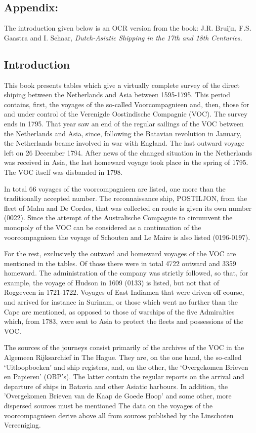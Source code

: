 \documentclass[10pt,twocolumn,fleqn]{article}
\begin{document}
\subsection*{Appendix: }
The introduction given below is an OCR version from the book:
J.R. Bruijn, F.S. Gaastra and I. Schaar, {\em Dutch-Asiatic Shipping in the 17th and 18th Centuries}.
\subsection*{Introduction}
This book presents tables which give a virtually complete survey of the 
direct shiping between the Netherlands and Asia between 1595-1795.
This period contains, first, the voyages of the so-called Voorcompagnieen and,
then, those for and under control of the Verenigde Oostindische Compagnie (VOC).
The survey ends in 1795.
That year saw an end of the regular sailings of the VOC between the Netherlands
and Asia, since, following the Batavian revolution in January, the Netherlands
beame involved in war with England. 
The last outward voyage left on 26 December 1794. 
After news of the changed situation in the Netherlands was received in Asia,
the last homeward voyage took place in the spring of 1795. 
The VOC itself was disbanded in 1798.

In total 66 voyages of the voorcompagnieen are listed, one more than 
the traditionally accepted number. The reconnaissance ship, POSTILJON, 
from the fleet of Mahu and De Cordes, that was collected en route 
is given its own number (0022). Since the attempt of the 
Australische Compagnie to circumvent the monopoly of the VOC can be 
considered as a continuation of the voorcompagnieen the voyage of 
Schouten and Le Maire is also listed (0196-0197).

For the rest, exclusively the outward and homeward voyages of the VOC 
are mentioned in the tables. Of those there were in total 4722 outward 
and 3359 homeward. The administration of the company was strictly followed, 
so that, for example, the voyage of Hudson in 1609 (0133) is listed,
but not that of Roggeveen in 1721-1722. 
Voyages of East Indiamen that were driven off course, and arrived for 
instance in Su­rinam, or those which went no further than the Cape are 
mentioned, as opposed to those of warships of the five Admiralties which, 
from 1783, were sent to Asia to protect the fleets and possessions of the VOC.

The sources of the journeys consist primarily of the archives of the VOC in 
the Algemeen Rijksarchief in The Hague. They are, on the one hand,
the so-called `Uitloopboeken' and ship registers, and, on the other, 
the `Overgekomen Brieven en Papieren' (OBP's). The latter contain the 
regular reports on the arrival and departure of ships in Batavia and other 
Asiatic harbours. In addition, the 'Overgekomen Brieven van de Kaap de 
Goede Hoop' and some other, more dispersed sources must be mentioned
The data on the voyages of the voorcompagnieen derive above all from 
sources published by the Linschoten Vereeniging.
\end{document}
